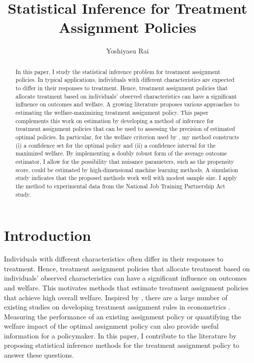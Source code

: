 \documentclass[12pt,oneside,reqno,english]{amsart}
\makeatletter
\newcommand{\reqnomode}{\tagsleft@false}
\theoremstyle{definition}
\makeatother
\begin{document}

\reqnomode

\title{Statistical Inference for Treatment Assignment Policies} 

\author{Yoshiyasu Rai}

\address{Department of Economics, University of Wisconsin-Madison, 1180 Observatory
Drive, Madison, WI 53706, USA.}


\begin{abstract}
In this paper, I study the statistical inference problem for treatment assignment policies. In typical applications, individuals with different characteristics are expected to differ in their responses to treatment. Hence, treatment assignment policies that allocate treatment based on individuals' observed characteristics can have a significant influence on outcomes and welfare. 
A growing literature proposes various approaches to estimating the welfare-maximizing treatment assignment policy. This paper complements this work on estimation by developing a method of inference for treatment assignment policies that can be used to assessing the precision of estimated optimal policies. In particular, for the welfare criterion used by \cite{KT:18}, my method constructs (i) a confidence set for the optimal policy and (ii) a confidence interval for the maximized welfare.
By implementing a doubly robust form of the average outcome estimator, I allow for the possibility that nuisance parameters, such as the propensity score, could be estimated by high-dimensional machine learning methods.
A simulation study indicates that the proposed methods work well with modest sample size. I apply the method to experimental data from the National Job Training Partnership Act study.
\end{abstract}
\maketitle

\section{Introduction}
Individuals with different characteristics often differ in their responses to treatment. 
Hence, treatment assignment policies that allocate treatment based on individuals' observed characteristics can have a significant influence on outcomes and welfare. 
This motivates methods that estimate treatment assignment policies that achieve high overall welfare. 
 Inspired by \cite{Manski:04}, there are a large number of existing studies on developing treatment assignment rules in econometrics 
 \citep{Dehejia:05, Stoye:09, Stoye:12, HP:09, Chamberlain:11, BD:12,Tetenov:12, Kasy:14,Kasy:16,KT:17, KT:18,MT:16, AW:17, MT:18}.
Measuring the performance of an existing assignment policy or quantifying the welfare impact of the optimal assignment policy 
can also provide useful information for a policymaker. 
In this paper, I contribute to the literature by proposing statistical inference methods for the treatment assignment policy to answer these questions. 
\end{document}
